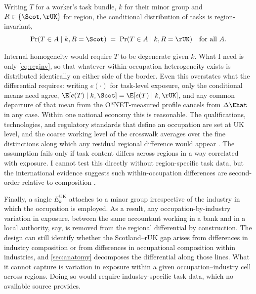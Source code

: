 \begin{assumption}\label{as:reginv}
Writing $T$ for a worker's task bundle, $k$ for their minor group and $R \in \{\Scot, \rUK\}$ for region, the conditional distribution of tasks is region-invariant,
\begin{equation}\label{eq:reginv}
\Pr(T \in A \mid k, R = \Scot) \;=\; \Pr(T \in A \mid k, R = \rUK)
\quad \text{for all } A .
\end{equation}
\end{assumption}

\noindent
Internal homogeneity would require $T$ to be degenerate given $k$. What I need is only \cref{eq:reginv}, so that whatever within-occupation heterogeneity exists is distributed identically on either side of the border. Even this overstates what the differential requires: writing $e(\cdot)$ for task-level exposure, only the conditional means need agree, $\E[e(T) \mid k, \Scot] = \E[e(T) \mid k, \rUK]$, and any common departure of that mean from the O*NET-measured profile cancels from $\Delta\Ehat$ in any case. Within one national economy this is reasonable. The qualifications, technologies, and regulatory standards that define an occupation are set at UK level, and the coarse working level of the crosswalk averages over the fine distinctions along which any residual regional difference would appear \citep{autor2013}. The assumption fails only if task content differs across regions in a way correlated with exposure. I cannot test this directly without region-specific task data, but the international evidence suggests such within-occupation differences are second-order relative to composition \citep{handel2012, autor2013}. 

Finally, a single $E^{\mathrm{UK}}_k$ attaches to a minor group irrespective of the industry in which the occupation is employed. As a result, any occupation-by-industry variation in exposure, between the same accountant working in a bank and in a local authority, say, is removed from the regional differential by construction. The design can still identify whether the Scotland--rUK gap arises from differences in industry composition or from differences in occupational composition within industries, and \cref{sec:anatomy} decomposes the differential along those lines. What it cannot capture is variation in exposure within a given occupation--industry cell across regions. Doing so would require industry-specific task data, which no available source provides.

